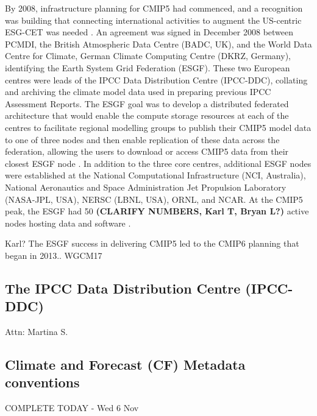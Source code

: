 \documentclass[gmd, preprint]{copernicus}
\newcommand{\mycomment}[1]{}
\def\cred#1{{\color{red}#1}}
\def\cblue#1{{\color{blue}#1}}
\begin{document}
By 2008, infrastructure planning for CMIP5 had commenced, and a recognition was building that connecting international activities to augment the US-centric ESG-CET was needed \citep{williams_global_2016}. An agreement was signed in December 2008 between PCMDI, the British Atmospheric Data Centre (BADC, UK), and the World Data Centre for Climate, German Climate Computing Centre (DKRZ, Germany), identifying the Earth System Grid Federation (ESGF). These two European centres were leads of the IPCC Data Distribution Centre (IPCC-DDC), collating and archiving the climate model data used in preparing previous IPCC Assessment Reports. The ESGF goal was to develop a distributed federated architecture that would enable the compute storage resources at each of the centres to facilitate regional modelling groups to publish their CMIP5 model data to one of three nodes and then enable replication of these data across the federation, allowing the users to download or access CMIP5 data from their closest ESGF node \citep{williams_earth_2011}. In addition to the three core centres, additional ESGF nodes were established at the National Computational Infrastructure (NCI, Australia), National Aeronautics and Space Administration Jet Propulsion Laboratory (NASA-JPL, USA), NERSC (LBNL, USA), ORNL, and NCAR. At the CMIP5 peak, the ESGF had 50 \cred{\textbf{(CLARIFY NUMBERS, Karl T, Bryan L?)}} active nodes hosting data and software \citep{williams_global_2016}.
\mycomment{
CMIP6 current nodes - https://aims2.llnl.gov/nodes
Very early CMIP5 http://web.archive.org/web/20111015000202/http://pcmdi3.llnl.gov/esgcet/home.htm 7 nodes ESG-CET + BADC, WDCC, NCI
ESG-CET NCAR, LLNL, ORNL https://extranet.gfdl.noaa.gov/~vb/curator/AR5-20071017/ESG-CET200710.pdf Oct 2007
2013 Aspen workshop - https://www.wcrp-climate.org/images/modelling/WGCM/WGCM17/WGCM17_report.pdf;
Middleton, Foster and Williams et al., 2006: Earth System Grid II final report 2001-2006 SCIDAC https://www.osti.gov/servlets/purl/1113798 https://doi.org/10.2172/1113798
}
\cred{Karl? The ESGF success in delivering CMIP5 led to the CMIP6 planning that began in 2013.. WGCM17}


\subsection{The IPCC Data Distribution Centre (IPCC-DDC)}
\label{sec:IPCC-DDC}
\cred{Attn: Martina S.}
\citep{stockhause_cmip6_2017,stockhause_twenty-five_2022}


\subsection{Climate and Forecast (CF) Metadata conventions}
\label{sec:CFConventions}
\cblue{COMPLETE TODAY - Wed 6 Nov}
\end{document}
